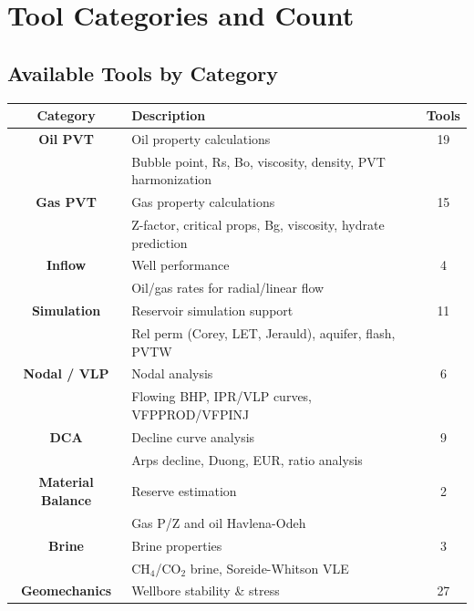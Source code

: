 \documentclass[11pt,a4paper]{article}
\begin{document}
\newpage

\section{Tool Categories and Count}

\subsection{Available Tools by Category}

\begin{table}[h]
\centering
\begin{tabular}{clc}
\toprule
\textbf{Category} & \textbf{Description} & \textbf{Tools} \\
\midrule
\textbf{Oil PVT} & Oil property calculations & 19 \\
 & \small Bubble point, Rs, Bo, viscosity, density, PVT harmonization & \\
\midrule
\textbf{Gas PVT} & Gas property calculations & 15 \\
 & \small Z-factor, critical props, Bg, viscosity, hydrate prediction & \\
\midrule
\textbf{Inflow} & Well performance & 4 \\
 & \small Oil/gas rates for radial/linear flow & \\
\midrule
\textbf{Simulation} & Reservoir simulation support & 11 \\
 & \small Rel perm (Corey, LET, Jerauld), aquifer, flash, PVTW & \\
\midrule
\textbf{Nodal / VLP} & Nodal analysis & 6 \\
 & \small Flowing BHP, IPR/VLP curves, VFPPROD/VFPINJ & \\
\midrule
\textbf{DCA} & Decline curve analysis & 9 \\
 & \small Arps decline, Duong, EUR, ratio analysis & \\
\midrule
\textbf{Material Balance} & Reserve estimation & 2 \\
 & \small Gas P/Z and oil Havlena-Odeh & \\
\midrule
\textbf{Brine} & Brine properties & 3 \\
 & \small CH$_4$/CO$_2$ brine, Soreide-Whitson VLE & \\
\midrule
\textbf{Geomechanics} & Wellbore stability \& stress & 27 \\

\end{tabular}
\end{table}
\end{document}
